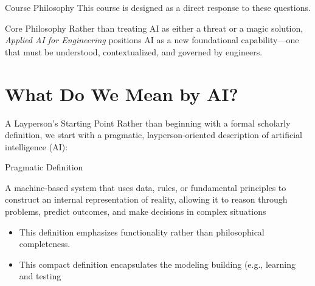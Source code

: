 \documentclass[german,10pt]{beamer}
\begin{document}
\begin{frame}{Course Philosophy}
    \justifying
    This course is designed as a direct response to these questions.
    
    \begin{conceptbox}{Core Philosophy}
    Rather than treating AI as either a threat or a magic solution, \emph{Applied AI for Engineering} positions AI as a new foundational capability—one that must be understood, contextualized, and governed by engineers.
    \end{conceptbox}
\end{frame}

\section{What Do We Mean by AI?}

\begin{frame}{A Layperson’s Starting Point}
    \justifying
    Rather than beginning with a formal scholarly definition, we start with a pragmatic, layperson-oriented description of artificial intelligence (AI):
    
    \vspace{1em}
    \begin{conceptbox}{Pragmatic Definition}


    A machine-based system that uses data, rules, or fundamental principles to construct an internal representation of reality, allowing it to reason through problems, predict outcomes, and make decisions in complex situations
    \end{conceptbox}
    
    \vspace{1em}
    \begin{itemize}
    \item This definition emphasizes functionality rather than philosophical completeness.
    \item  This compact definition encapsulates the modeling building (e.g., learning and testing
    \end{itemize}
\end{frame}
\end{document}
